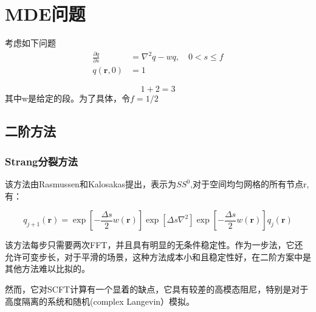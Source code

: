 \newpage
\chapter{MDE问题} \label{Chap:Basic_Knowledge}
考虑如下问题
\begin{equation}
	\begin{aligned} \frac{\partial q}{\partial s} &=\nabla^{2} q-w q, \quad 0<s \leq f \\ q(\mathbf{r}, 0) &=1 \end{aligned}
\end{equation}

\begin{equation}
1+2=3
\end{equation}
其中w是给定的段。为了具体，令$f=1/2$
\section{二阶方法}

\subsection{Strang分裂方法}
该方法由Rasmussen和Kalosakas提出，表示为$SS^0$,对于空间均匀网格的所有节点r,有：

\begin{equation}
q_{j+1}(\mathbf{r})=\exp \left[-\frac{\Delta s}{2} w(\mathbf{r})\right] \exp \left[\Delta s \nabla^{2}\right] \exp \left[-\frac{\Delta s}{2} w(\mathbf{r})\right] q_{j}(\mathbf{r})
\end{equation}

该方法每步只需要两次FFT，并且具有明显的无条件稳定性。作为一步法，它还允许可变步长，对于平滑的场景，这种方法成本小和且稳定性好，在二阶方案中是其他方法难以比拟的。

然而，它对SCFT计算有一个显着的缺点，它具有较差的高模态阻尼，特别是对于高度隔离的系统和随机(complex Langevin）模拟。



